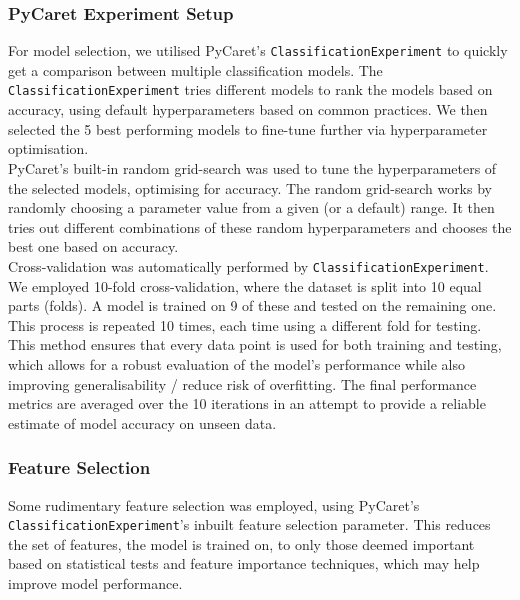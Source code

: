 \documentclass[a4paper,12pt]{article}
\begin{document}
\subsubsection{PyCaret Experiment Setup}
For model selection, we utilised PyCaret's \texttt{ClassificationExperiment} to quickly get a 
comparison between multiple classification models. The \texttt{ClassificationExperiment} tries 
different models to rank the models based on accuracy, using default hyperparameters based on common practices. 
We then selected the 5 best performing models to fine-tune further via hyperparameter optimisation. 
\\
PyCaret’s built-in random grid-search was used to tune the hyperparameters of the selected models, 
optimising for accuracy. The random grid-search works by 
randomly choosing a parameter value from a given (or a default) range. It then tries out different combinations
of these random hyperparameters and chooses the best one based on accuracy.
\\
Cross-validation was automatically performed by \texttt{ClassificationExperiment}. 
We employed 10-fold cross-validation, where the dataset is split into 10 equal parts (folds). 
A model is trained on 9 of these and tested on the remaining one. This process is repeated 10 times, 
each time using a different fold for testing. This method ensures that every data point is used for both training 
and testing, which allows for a robust evaluation of the model's performance while also improving generalisability / 
reduce risk of overfitting. The final performance metrics are averaged over the 10 iterations in an attempt to 
provide a reliable estimate of model accuracy on unseen data.



\subsubsection{Feature Selection}
Some rudimentary feature selection was employed, using PyCaret's \texttt{ClassificationExperiment}'s inbuilt
feature selection parameter. This reduces the set of features, the model is trained on, to only those deemed 
important based on statistical tests and feature importance techniques, which may help improve model 
performance.
\end{document}
